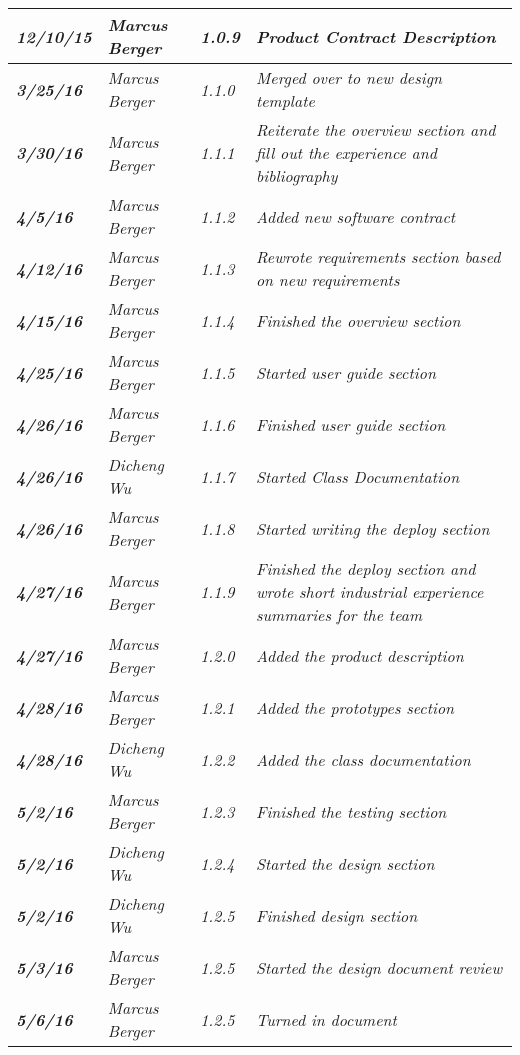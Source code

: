 \begin{tabular}{|>{\raggedright}p{1.5cm}|>{\raggedright}p{3cm}|>{\raggedright}p{1.5cm}|>{\raggedright}p{9cm}|}
\hline
\textit{\textbf{12/10/15}} & \textit{Marcus Berger} & \textit{1.0.9} & \textit{Product Contract Description}\tabularnewline
\hline
\textit{\textbf{3/25/16}} & \textit{Marcus Berger} & \textit{1.1.0} & \textit{Merged over to new design template}\tabularnewline
\hline
\textit{\textbf{3/30/16}} & \textit{Marcus Berger} & \textit{1.1.1} & \textit{Reiterate the overview section and fill out the experience and bibliography}\tabularnewline
\hline
\textit{\textbf{4/5/16}} & \textit{Marcus Berger} & \textit{1.1.2} & \textit{Added new software contract}\tabularnewline
\hline
\textit{\textbf{4/12/16}} & \textit{Marcus Berger} & \textit{1.1.3} & \textit{Rewrote requirements section based on new requirements }\tabularnewline
\hline
\textit{\textbf{4/15/16}} & \textit{Marcus Berger} & \textit{1.1.4} & \textit{Finished the overview section}\tabularnewline
\hline
\textit{\textbf{4/25/16}} & \textit{Marcus Berger} & \textit{1.1.5} & \textit{Started user guide section}\tabularnewline
\hline
\textit{\textbf{4/26/16}} & \textit{Marcus Berger} & \textit{1.1.6} & \textit{Finished user guide section}\tabularnewline
\hline
\textit{\textbf{4/26/16}} & \textit{Dicheng Wu} & \textit{1.1.7} & \textit{Started Class Documentation}\tabularnewline
\hline
\textit{\textbf{4/26/16}} & \textit{Marcus Berger} & \textit{1.1.8} & \textit{Started writing the deploy section}\tabularnewline
\hline
\textit{\textbf{4/27/16}} & \textit{Marcus Berger} & \textit{1.1.9} & \textit{Finished the deploy section and wrote short industrial experience summaries for the team}\tabularnewline
\hline
\textit{\textbf{4/27/16}} & \textit{Marcus Berger} & \textit{1.2.0} & \textit{Added the product description}\tabularnewline
\hline
\textit{\textbf{4/28/16}} & \textit{Marcus Berger} & \textit{1.2.1} & \textit{Added the prototypes section}\tabularnewline
\hline
\textit{\textbf{4/28/16}} & \textit{Dicheng Wu} & \textit{1.2.2} & \textit{Added the class documentation}\tabularnewline
\hline
\hline
\textit{\textbf{5/2/16}} & \textit{Marcus Berger} & \textit{1.2.3} & \textit{Finished the testing section}\tabularnewline
\hline
\textit{\textbf{5/2/16}} & \textit{Dicheng Wu} & \textit{1.2.4} & \textit{Started the design section}\tabularnewline
\hline
\textit{\textbf{5/2/16}} & \textit{Dicheng Wu} & \textit{1.2.5} & \textit{Finished design section}\tabularnewline
\hline
\textit{\textbf{5/3/16}} & \textit{Marcus Berger} & \textit{1.2.5} & \textit{Started the design document review}\tabularnewline
\hline
\hline
\textit{\textbf{5/6/16}} & \textit{Marcus Berger} & \textit{1.2.5} & \textit{Turned in document}\tabularnewline
\hline
\end{tabular}
\vfill

